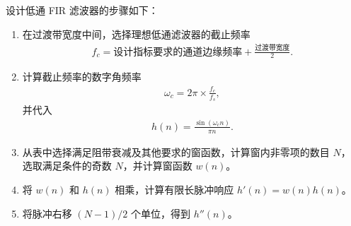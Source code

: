 \begin{example}
    设计低通 FIR 滤波器的步骤如下：
    \begin{enumerate}
        \item 在过渡带宽度中间，选择理想低通滤波器的截止频率
            \begin{align*}
                f_c = \text{设计指标要求的通道边缘频率} + \frac{\text{过渡带宽度}}{2}.
            \end{align*}
        \item 计算截止频率的数字角频率
            \begin{align*}
                \omega_c = 2\pi \times \frac{f_c}{f_s},
            \end{align*}
            并代入
            \begin{align*}
                h(n) = \frac{\sin(\omega_c n)}{\pi n}.
            \end{align*}
        \item 从表中选择满足阻带衰减及其他要求的窗函数，计算窗内非零项的数目 $N$，
            选取满足条件的奇数 $N$，并计算窗函数 $w(n)$。
        \item 将 $w(n)$ 和 $h(n)$ 相乘，计算有限长脉冲响应 $h'(n) = w(n)h(n)$。
        \item 将脉冲右移 $(N - 1) / 2$ 个单位，得到 $h''(n)$。
    \end{enumerate}
\end{example}

